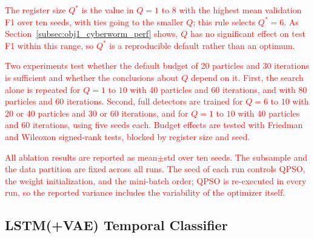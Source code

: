 \documentclass[conference]{IEEEtran}
\begin{document}
\textcolor{red}{The register size $Q^{*}$ is the value in
$Q=1$ to $8$ with the highest mean validation F1 over ten seeds, with
ties going to the smaller $Q$; this rule selects $Q^{*}=6$. As Section~\ref{subsec:obj1_cyberworm_perf}
shows, $Q$ has no significant effect on test F1 within this range, so $Q^{*}$ is a
reproducible default rather than an optimum.}

\textcolor{red}{Two experiments test whether the default
budget of 20 particles and 30 iterations is sufficient and whether
the conclusions about $Q$ depend on it. First, the search alone is
repeated for $Q=1$ to $10$ with 40 particles and 60 iterations, and
with 80 particles and 60 iterations. Second, full detectors are
trained for $Q=6$ to $10$ with 20 or 40 particles and 30 or 60
iterations, and for $Q=1$ to $10$ with 40 particles and 60
iterations, using five seeds each. Budget effects are tested with
Friedman and Wilcoxon signed-rank tests, blocked by register size
and seed.}

\textcolor{red}{All ablation results are reported as
mean$\pm$std over ten seeds. The subsample and the data partition are
fixed across all runs. The seed of each run controls QPSO, the weight
initialization, and the mini-batch order; QPSO is re-executed in
every run, so the reported variance includes the variability of the
optimizer itself.}

\subsection{LSTM(+VAE) Temporal Classifier}
\label{subsec:model_training}
\end{document}
